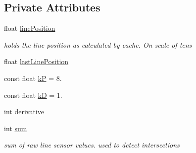 \subsection*{Private Attributes}
\begin{DoxyCompactItemize}
\item 
float \hyperlink{classLineSensor_ac21af83a73e9e55500324d9d34ed2498}{line\-Position}
\begin{DoxyCompactList}\small\item\em holds the line position as calculated by cache. On scale of tens \end{DoxyCompactList}\item 
float \hyperlink{classLineSensor_a347e843234a242ded12e83badf4718ed}{last\-Line\-Position}
\item 
const float \hyperlink{classLineSensor_af246497cb5a3386afcc4ce864949c57f}{k\-P} = 8.
\item 
const float \hyperlink{classLineSensor_a62c587ff3d58f72a74ae39429b7d0837}{k\-D} = 1.
\item 
int \hyperlink{classLineSensor_aa5bd7119b2332eab8b6c850f8fa3d558}{derivative}
\item 
int \hyperlink{classLineSensor_af574319adc88f5949f03239b2bcbc222}{sum}
\begin{DoxyCompactList}\small\item\em sum of raw line sensor values. used to detect intersections \end{DoxyCompactList}\end{DoxyCompactItemize}
